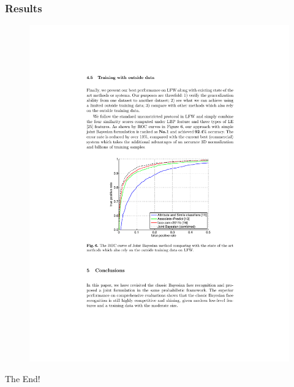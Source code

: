 \documentclass{beamer}
\begin{document}
\begin{frame}
\frametitle{Results}
\begin{figure}[H]
\centering
\includegraphics[height=\textheight, trim=2.25in 3.5in 2.25in 4.2in, clip]{Chen13}
\end{figure}
\end{frame}

\begin{frame}
\centerline{The End!}
\end{frame}

\end{document}
